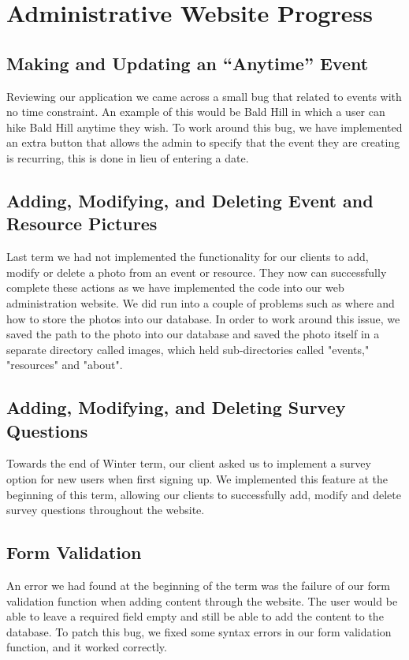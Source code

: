 \documentclass[onecolumn, draftclsnofoot,10pt, compsoc]{IEEEtran}
\begin{document}
\section{Administrative Website Progress}

  \subsection{Making and Updating an “Anytime” Event}
  Reviewing our application we came across a small bug that related to events with no time constraint. An example of this would be Bald Hill in which a user can hike Bald Hill
  anytime they wish. To work around this bug, we have implemented an extra button that allows the admin to specify that the event they are creating is recurring, this is done in lieu of entering a date.

  \subsection{Adding, Modifying, and Deleting Event and Resource Pictures}
  Last term we had not implemented the functionality for our clients to add, modify or delete a photo from an event or resource. They now can successfully complete these actions as we have implemented the code into our web administration website. We did run into a couple of problems such as where and how to store the photos into our database. In order to work around this issue, we saved the path to the photo into our database and saved the photo itself in a separate directory called images, which held sub-directories called "events," "resources" and "about".

  \subsection{Adding, Modifying, and Deleting Survey Questions}
  Towards the end of Winter term, our client asked us to implement a survey option for new users when first signing up. We implemented this feature at the beginning of this term, allowing our clients to successfully add, modify and delete survey questions throughout the website.

  \subsection{Form Validation}
  An error we had found at the beginning of the term was the failure of our form validation function when adding content through the website. The user would be able to leave a required field empty and still be able to add the content to the database. To patch this bug, we fixed some syntax errors in our form validation function, and it worked correctly.
\end{document}
